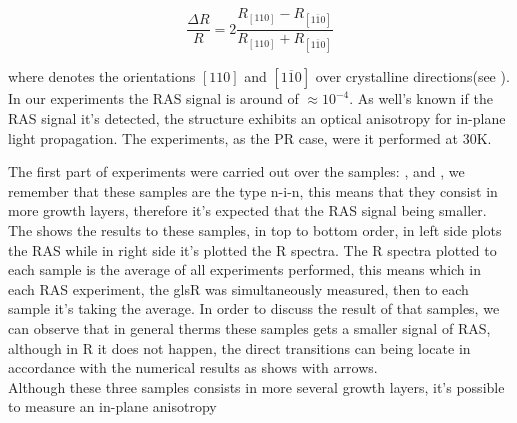 \begin{equation}\label{eqn:chapter-3-sec-ras-rasequation}
\dfrac{\Delta R}{R} = 2\dfrac{R_{\left[110\right]}-R_{\left[1\overline{1}0\right]}}{R_{\left[110\right]}+
R_{\left[1\overline{1}0\right]}}
\end{equation}

where denotes the orientations $\left[110\right]$ and $\left[1\overline{1}0\right]$ over crystalline directions(see ). In our experiments the \gls{RAS} signal is around of $\approx 10^{-4}$. As well's known if the \gls{RAS} signal it's detected, the structure exhibits an optical anisotropy for in-plane light propagation\cite{koopmans1998microscopic}. The experiments, as the PR case, were it performed at 30K. 

The first part of experiments were carried out over the samples: ,  and ,  we remember that these samples are the type n-i-n, this means that they consist in more growth layers, therefore it's expected that the \gls{RAS} signal being smaller. The  shows the results to these samples, in top to bottom order, in left side plots the \gls{RAS} while in right side it's plotted the \gls{R} spectra. The \gls{R} spectra plotted to each sample is the average of all experiments performed, this means which in each \gls{RAS} experiment, the gls{R} was simultaneously measured, then to each sample it's taking the average.  In order to discuss the result of that samples, we can observe that in general therms these samples gets a smaller signal of \gls{RAS}, although in \gls{R} it does not happen, the direct transitions can being locate in accordance with the numerical results as shows with arrows.\\
 Although these three samples consists in more several growth layers, it's possible to measure an in-plane anisotropy    
